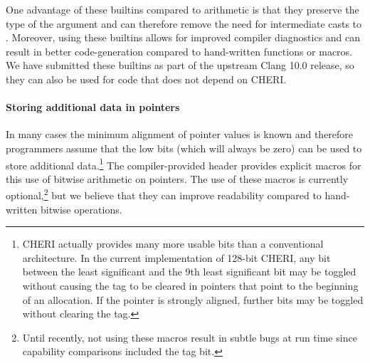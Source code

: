 \documentclass[12pt,twoside,openright,usletter]{article}
\newcommand{\ccode}[1]{{\small\ttfamily{#1}}}
\newcommand{\cuintptrt}{{\ccode{uintptr\_t}}\xspace}
\newcommand{\note}[2]{{\color{blue}[ Note: #1 - #2]}}
\renewcommand{\note}[2]{\relax\ifhmode\unskip\fi}
\newcommand{\arnote}[1]{\note{#1}{Alex R.}}
\newcommand{\rwnote}[1]{\note{#1}{Robert W.}}
\newcommand{\psnote}[1]{\note{#1}{Peter S.}}
\begin{document}
\rwnote{It would be nice if we had, and could document here, cheri\_ versions
  of these macros.}

One advantage of these builtins compared to \cuintptrt arithmetic is that they preserve the
type of the argument and can therefore remove the need for intermediate casts to \cuintptrt.
Moreover, using these builtins allows for improved compiler diagnostics and can result in better code-generation compared to hand-written functions or macros.
We have submitted these builtins as part of the upstream Clang 10.0 release, so they can also be used for code that does not depend on CHERI.
\arnote{Should I include some of the documentation I wrote for upstream LLVM? (\url{https://clang.llvm.org/docs/LanguageExtensions.html\#alignment-builtins})}

\paragraph{Storing additional data in pointers}
\label{sec:low-pointer-bits}
In many cases the minimum alignment of pointer values is known and therefore
programmers assume that the low bits (which will always be zero) can be
used to store additional data.\footnote{%
CHERI actually provides many more usable bits than a conventional architecture.
In the current implementation of 128-bit CHERI, any bit between\psnote{inclusive?} the least
significant and the 9th least significant bit may be toggled without causing
the tag to be cleared in pointers that point to the beginning of an allocation.
\psnote{This is confusing -- not clearing the tag isn't the same as not destroying part of the pointer data...}
If the pointer is strongly aligned, further bits may be toggled without clearing the tag.}
The compiler-provided header \ccode{<cheri.h>} provides explicit macros for this
use of bitwise arithmetic on pointers.
The use of these macros is currently optional,\footnote{%
Until recently, not using these macros result in subtle bugs at run time since capability comparisons included the tag bit.}
but we believe that they can improve readability compared to hand-written bitwise operations.

\psnote{should the non-usability of high bits, mentioned at the end of \S3, also be mentioned here?}\arnote{Yes}
\end{document}

